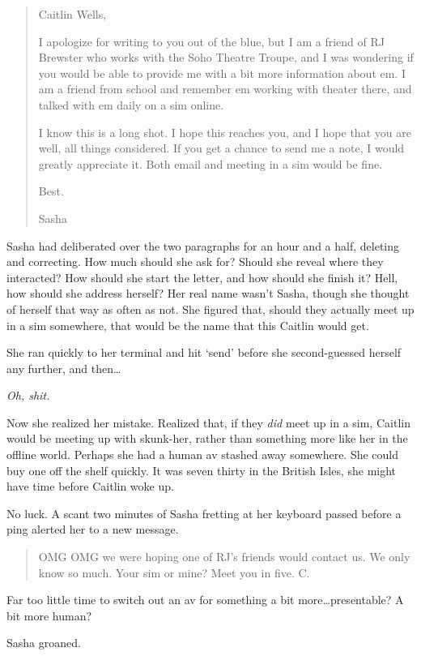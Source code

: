 \begin{quote}
Caitlin Wells,

I apologize for writing to you out of the blue, but I am a friend of RJ Brewster who works with the Soho Theatre Troupe, and I was wondering if you would be able to provide me with a bit more information about em. I am a friend from school and remember em working with theater there, and talked with em daily on a sim online.

I know this is a long shot. I hope this reaches you, and I hope that you are well, all things considered. If you get a chance to send me a note, I would greatly appreciate it. Both email and meeting in a sim would be fine.

Best.

Sasha
\end{quote}

Sasha had deliberated over the two paragraphs for an hour and a half, deleting and correcting. How much should she ask for? Should she reveal where they interacted? How should she start the letter, and how should she finish it? Hell, how should she address herself? Her real name wasn't Sasha, though she thought of herself that way as often as not. She figured that, should they actually meet up in a sim somewhere, that would be the name that this Caitlin would get.

She ran quickly to her terminal and hit `send' before she second-guessed herself any further, and then\ldots{}

\emph{Oh, shit.}

Now she realized her mistake. Realized that, if they \emph{did} meet up in a sim, Caitlin would be meeting up with skunk-her, rather than something more like her in the offline world. Perhaps she had a human av stashed away somewhere. She could buy one off the shelf quickly. It was seven thirty in the British Isles, she might have time before Caitlin woke up.

No luck. A scant two minutes of Sasha fretting at her keyboard passed before a ping alerted her to a new message.

\begin{quote}
OMG OMG we were hoping one of RJ's friends would contact us. We only know so much. Your sim or mine? Meet you in five. C.
\end{quote}

Far too little time to switch out an av for something a bit more\ldots{}presentable? A bit more human?

Sasha groaned.

